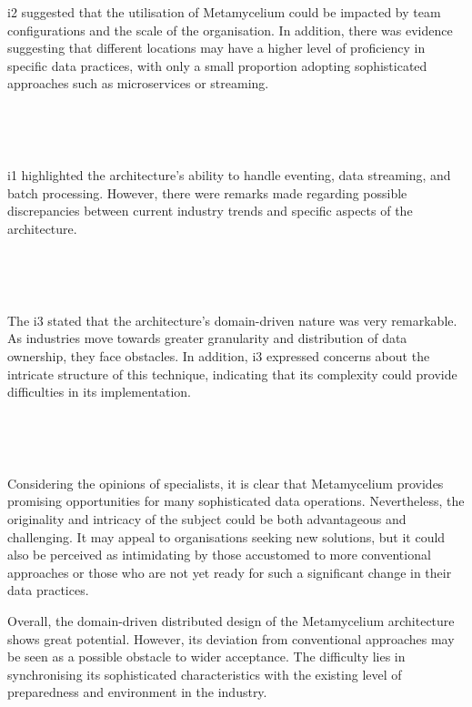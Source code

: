 \documentclass[journal]{IEEEtran}
\begin{document}
i2 suggested that the utilisation of Metamycelium could be impacted by team configurations and the scale of the organisation. In addition, there was evidence suggesting that different locations may have a higher level of proficiency in specific data practices, with only a small proportion adopting sophisticated approaches such as microservices or streaming.

\,

\setlength{\fboxsep}{0.3em}
\noindent{}

\,

i1 highlighted the architecture's ability to handle eventing, data streaming, and batch processing. However, there were remarks made regarding possible discrepancies between current industry trends and specific aspects of the architecture.


\,

\setlength{\fboxsep}{0.3em}
\noindent{}

\,

The i3 stated that the architecture's domain-driven nature was very remarkable. As industries move towards greater granularity and distribution of data ownership, they face obstacles. In addition, i3 expressed concerns about the intricate structure of this technique, indicating that its complexity could provide difficulties in its implementation.


\,

\setlength{\fboxsep}{0.3em}
\noindent{}

\,


Considering the opinions of specialists, it is clear that Metamycelium provides promising opportunities for many sophisticated data operations. Nevertheless, the originality and intricacy of the subject could be both advantageous and challenging. It may appeal to organisations seeking new solutions, but it could also be perceived as intimidating by those accustomed to more conventional approaches or those who are not yet ready for such a significant change in their data practices.

Overall, the domain-driven distributed design of the Metamycelium architecture shows great potential. However, its deviation from conventional approaches may be seen as a possible obstacle to wider acceptance. The difficulty lies in synchronising its sophisticated characteristics with the existing level of preparedness and environment in the industry.
\end{document}
